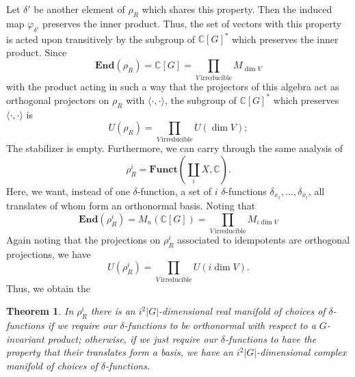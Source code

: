 \documentclass[11pt]{amsart}
\newtheorem{thm}{Theorem}
\numberwithin{thm}{section}
\begin{document}
Let $\delta'$ be another element of $\rho_R$ which shares this property.  Then the induced map $\varphi_{\delta'}$ preserves the inner product.  Thus, the set of vectors with this property is acted upon transitively by the subgroup of $\mathbb{C}[G]^*$ which preserves the inner product.  Since
\[
{\mathbf{End}}(\rho_R) = \mathbb{C}[G] = \prod_{V \,\mathrm{ irreducible}} M_{\dim V}
\]
with the product acting in such a way that the projectors of this algebra act as orthogonal projectors on $\rho_R$ with $\langle\cdot,\cdot\rangle$, the subgroup of $\mathbb{C}[G]^*$ which preserves $\langle\cdot,\cdot\rangle$ is 
\[
U(\rho_R) = \prod_{V\,\mathrm{ irreducible}} U(\dim V);
\]
The stabilizer is empty.  Furthermore, we can carry through the same analysis of
\[
\rho_R^i = {\mathbf{Funct}}(\coprod_i X, \mathbb{C}).
\]
Here, we want, instead of one $\delta$-function, a set of $i$ $\delta$-functions $\delta_{x_1}, \dots, \delta_{x_i}$, all translates of whom form an orthonormal basis.  Noting that
\[
{\mathbf{End}}(\rho_R^i) = M_n(\mathbb{C}[G]) = \prod_{V\,\mathrm{irreducible}} M_{i\dim V}
\]
Again noting that the projections on $\rho_R^i$ associated to idempotents are orthogonal projections, we have
\[
U(\rho_R^i) = \prod_{V\,\mathrm{irreducible}} U(i\dim V).
\]
Thus, we obtain the
\begin{thm}\label{thm:deltachoices} In $\rho_R^i$ there is an  $i^2|G|$-dimensional real manifold of choices of $\delta$-functions if we require our $\delta$-functions to be orthonormal with respect to a $G$-invariant product; otherwise, if we just require our $\delta$-functions to have the property that their translates form a basis, we have an $i^2|G|$-dimensional complex manifold of choices of $\delta$-functions.
\end{thm}
\end{document}
